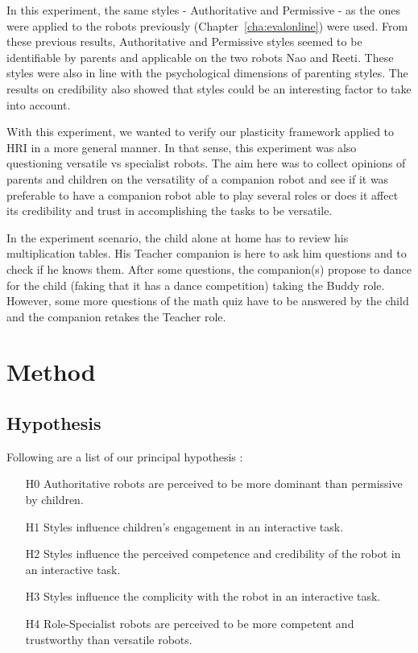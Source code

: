 \documentclass[smallextended]{svjour3}
\begin{document}
In this experiment, the same styles - Authoritative and Permissive -  as the ones were applied to the robots previously (Chapter~\ref{cha:evalonline}) were used.
From these previous results, Authoritative and Permissive styles seemed to be identifiable by parents and applicable on the two robots Nao and Reeti. 
These styles were also in line with the psychological dimensions of parenting styles. 
The results on credibility also showed that styles could be an interesting factor to take into account. 

With this experiment, we wanted to verify our plasticity framework applied to HRI in a more general manner. 
In that sense, this experiment was also questioning versatile vs specialist robots. 
The aim here was to collect opinions of parents and children on the versatility of a companion robot and see if it was preferable to have a companion robot able to play several roles or does it affect its credibility and trust in accomplishing the tasks to be versatile.

In the experiment scenario, the child alone at home has to review his multiplication tables. 
His Teacher companion is here to ask him questions and to check if he knows them. 
After some questions, the companion(s) propose to dance for the child (faking that it has a dance competition) taking the Buddy role. 
However, some more questions of the math quiz have to be answered by the child and the companion retakes the Teacher role.


\section{Method}
\subsection{Hypothesis}
Following are a list of our principal hypothesis :
\begin{itemize}[noitemsep,nolistsep]
	\item[H0] Authoritative robots are perceived to be more dominant than permissive by children.
	\item[H1] Styles influence children's engagement in an interactive task.
	\item[H2] Styles influence the perceived competence and credibility of the robot in an interactive task.
	\item[H3] Styles influence the complicity with the robot in an interactive task.
	\item[H4] Role-Specialist robots are perceived to be more competent and trustworthy than versatile robots.
\end{itemize}
\end{document}
